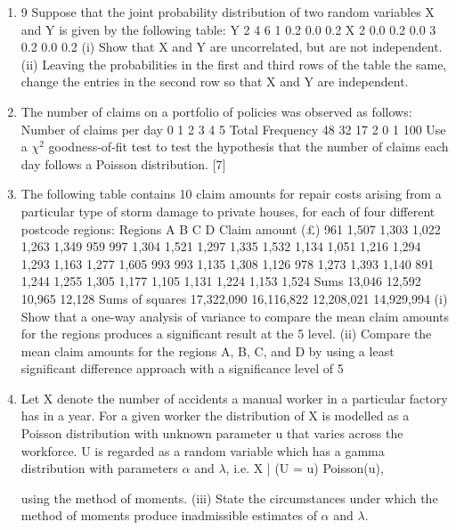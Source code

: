 \documentclass[a4paper,12pt]{article}
\begin{document}
\begin{enumerate}
\item
9 Suppose that the joint probability distribution of two random variables X and Y is
given by the following table:
Y
2 4 6
1 0.2 0.0 0.2
X 2 0.0 0.2 0.0
3 0.2 0.0 0.2
(i) Show that X and Y are uncorrelated, but are not independent. 
(ii) Leaving the probabilities in the first and third rows of the table the same,
change the entries in the second row so that X and Y are independent. 
\item  The number of claims on a portfolio of policies was observed as follows:
Number of claims per day 0 1 2 3 4 5 Total
Frequency 48 32 17 2 0 1 100
Use a $\chi^2$ goodness-of-fit test to test the hypothesis that the number of claims each day
follows a Poisson distribution. [7]
\item  The following table contains 10 claim amounts for repair costs arising from a
particular type of storm damage to private houses, for each of four different postcode
regions:
Regions
A B C D
Claim amount (£) 961 1,507 1,303 1,022
1,263 1,349 959 997
1,304 1,521 1,297 1,335
1,532 1,134 1,051 1,216
1,294 1,293 1,163 1,277
1,605 993 993 1,135
1,308 1,126 978 1,273
1,393 1,140 891 1,244
1,255 1,305 1,177 1,105
1,131 1,224 1,153 1,524
Sums 13,046 12,592 10,965 12,128
Sums of squares 17,322,090 16,116,822 12,208,021 14,929,994
(i) Show that a one-way analysis of variance to compare the mean claim amounts
for the regions produces a significant result at the 5%
level. 
(ii) Compare the mean claim amounts for the regions A, B, C, and D by using a
least significant difference approach with a significance level of 5%
\item  Let X denote the number of accidents a manual worker in a particular factory has in a
year. For a given worker the distribution of X is modelled as a Poisson distribution
with unknown parameter u that varies across the workforce. U is regarded as a
random variable which has a gamma distribution with parameters  $\alpha$ and $\lambda$, i.e.
X | (U = u) 	 Poisson(u),

using the method of moments. 
(iii) State the circumstances under which the method of moments produce
inadmissible estimates of $\alpha$ and $\lambda$. 
\end{enumerate}
\end{document}
